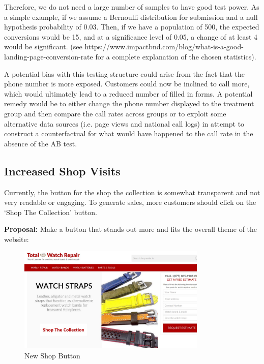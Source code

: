 \documentclass[12pt, authoryear]{elsarticle}
\begin{document}
Therefore, we do not need a large number of samples to have good test power. As a simple example, if we assume a Bernoulli distribution for submission and a null hypothesis probability of 0.03.  Then, if we have a population of 500, the expected conversions would be 15, and at a significance level of 0.05, a change of at least 4 would be significant. (see https://www.impactbnd.com/blog/what-is-a-good-landing-page-conversion-rate for a complete explanation of the chosen statistics). 

A potential bias with this testing structure could arise from the fact that the phone number is more exposed. Customers could now be inclined to call more, which would ultimately lead to a reduced number of filled in forms. A potential remedy would be to either change the phone number displayed to the treatment group and then compare the call rates across groups or to exploit some alternative data sources (i.e. page views and national call logs) in attempt to construct a counterfactual for what would have happened to the call rate in the absence of the AB test.

\subsection*{Increased Shop Visits}

Currently, the button for the shop the collection is somewhat transparent and not very readable or engaging. To generate sales, more customers should click on the ‘Shop The Collection’ button.  

\textbf{Proposal:} Make a button that stands out more and fits the overall theme of the website:

\begin{figure}[H]
	\centering
	\includegraphics[clip, angle=0, width=0.8\textwidth]{New_Shop_Button.jpg}
	\caption{New Shop Button}\label{NewLandingPage}
\end{figure}
\end{document}
